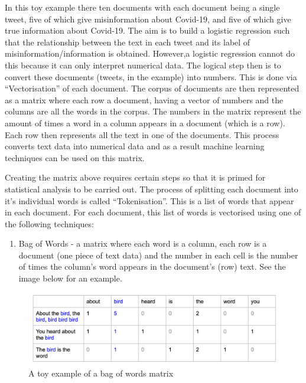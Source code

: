 \documentclass[
]{article}
\providecommand{\tightlist}{%
  \setlength{\itemsep}{0pt}\setlength{\parskip}{0pt}}
\begin{document}
In this toy example there ten documents with each document being a
single tweet, five of which give misinformation about Covid-19, and five
of which give true information about Covid-19. The aim is to build a
logistic regression such that the relationship between the text in each
tweet and its label of misinformation/information is obtained. However,a
logistic regression cannot do this because it can only interpret
numerical data. The logical step then is to convert these documents
(tweets, in the example) into numbers. This is done via
``Vectorisation'' of each document. The corpus of documents are then
represented as a matrix where each row a document, having a vector of
numbers and the columns are all the words in the corpus. The numbers in
the matrix represent the amount of times a word in a column appears in a
document (which is a row). Each row then represents all the text in one
of the documents. This process converts text data into numerical data
and as a result machine learning techniques can be used on this matrix.

Creating the matrix above requires certain steps so that it is primed
for statistical analysis to be carried out. The process of splitting
each document into it's individual words is called ``Tokenisation''.
This is a list of words that appear in each document. For each document,
this list of words is vectorised using one of the following techniques:

\begin{enumerate}
\def\labelenumi{\arabic{enumi}.}
\tightlist
\item
  Bag of Words - a matrix where each word is a column, each row is a
  document (one piece of text data) and the number in each cell is the
  number of times the column's word appears in the document's (row)
  text. See the image below for an example.
\end{enumerate}

\begin{figure}
\includegraphics[width=1\linewidth]{images/16034397439042_surfin bird bow} \caption{A toy example of a bag of words matrix}\label{fig:unnamed-chunk-1}
\end{figure}
\end{document}
